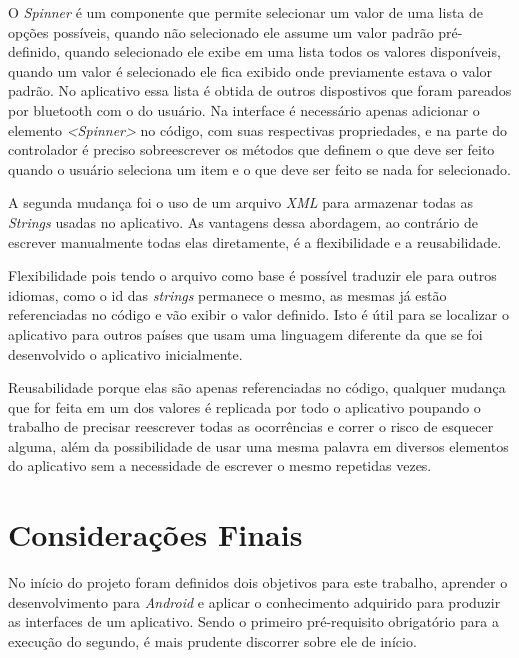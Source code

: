 \documentclass[hidelinks,12pt]{article}
\begin{document}
O \textit{Spinner} \'e um componente que permite selecionar um valor de uma lista de op\c{c}\~oes poss\'iveis, quando n\~ao selecionado ele assume um valor padr\~ao pr\'e-definido, quando selecionado ele exibe em uma lista todos os valores dispon\'iveis, quando um valor \'e selecionado ele fica exibido onde previamente estava o valor padr\~ao. No aplicativo essa lista \'e obtida de outros dispostivos que foram pareados por bluetooth com o do usu\'ario.
Na interface \'e necess\'ario apenas adicionar o elemento \textit{\textless{Spinner}\textgreater} no c\'odigo, com suas respectivas propriedades, e na parte do controlador \'e preciso sobreescrever os m\'etodos que definem o que deve ser feito quando o usu\'ario seleciona um item e o que deve ser feito se nada for selecionado.

A segunda mudan\c{c}a foi o uso de um arquivo \textit{XML} para armazenar todas as \textit{Strings} usadas no aplicativo. As vantagens dessa abordagem, ao contr\'ario de escrever manualmente todas elas diretamente, \'e a flexibilidade e a reusabilidade.

Flexibilidade pois tendo o arquivo como base \'e poss\'ivel traduzir ele para outros idiomas, como o id das \textit{strings} permanece o mesmo, as mesmas j\'a est\~ao referenciadas no c\'odigo e v\~ao exibir o valor definido. Isto \'e útil para se localizar o aplicativo para outros pa\'ises que usam uma linguagem diferente da que se foi desenvolvido o aplicativo inicialmente.

Reusabilidade porque elas s\~ao apenas referenciadas no c\'odigo, qualquer mudan\c{c}a que for feita em um dos valores \'e replicada por todo o aplicativo poupando o trabalho de precisar reescrever todas as ocorrências e correr o risco de esquecer alguma, al\'em da possibilidade de usar uma mesma palavra em diversos elementos do aplicativo sem a necessidade de escrever o mesmo repetidas vezes.
\section{Considera\c{c}\~oes Finais}
No in\'icio do projeto foram definidos dois objetivos para este trabalho, aprender o desenvolvimento para \textit{Android} e aplicar o conhecimento adquirido para produzir as interfaces de um aplicativo. Sendo o primeiro pr\'e-requisito obrigat\'orio para a execu\c{c}\~ao do segundo, \'e mais prudente discorrer sobre ele de in\'icio.
\end{document}
